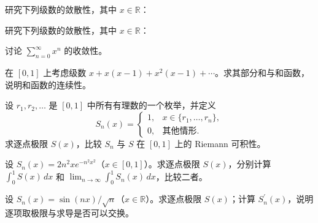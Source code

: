 \noindent\begin{minipage}{\textwidth}
研究下列级数的敛散性，其中 $x\in\mathbb R$：
\end{minipage}\par\vfill
\newpage
\noindent\begin{minipage}{\textwidth}
研究下列级数的敛散性，其中 $x\in\mathbb R$：
\end{minipage}\par\vfill
\noindent\begin{minipage}{\textwidth}
讨论 $\displaystyle\sum_{n=0}^{\infty}x^n$ 的收敛性。
\end{minipage}\par\vfill
\noindent\begin{minipage}{\textwidth}
在 $[0,1]$ 上考虑级数 $x+x(x-1)+x^2(x-1)+\cdots$。求其部分和与和函数，说明和函数的连续性。
\end{minipage}\par\vfill
\noindent\begin{minipage}{\textwidth}
设 $r_1,r_2,\ldots$ 是 $[0,1]$ 中所有有理数的一个枚举，并定义\[S_n(x)=\begin{cases}1,&x\in\{r_1,\ldots,r_n\},\\0,&\text{其他情形}.\end{cases}\]求逐点极限 $S(x)$，比较 $S_n$ 与 $S$ 在 $[0,1]$ 上的 Riemann 可积性。
\end{minipage}\par\vfill
\newpage
\noindent\begin{minipage}{\textwidth}
设 $S_n(x)=2n^2xe^{-n^2x^2}$（$x\in[0,1]$）。求逐点极限 $S(x)$，分别计算 $\int_0^1 S(x)\,dx$ 和 $\lim_{n\to\infty}\int_0^1 S_n(x)\,dx$，比较二者。
\end{minipage}\par\vfill
\noindent\begin{minipage}{\textwidth}
设 $S_n(x)=\sin(nx)/\sqrt n$（$x\in\mathbb R$）。求逐点极限 $S(x)$；计算 $S_n^{\prime}(x)$，说明逐项取极限与求导是否可以交换。
\end{minipage}\par\vfill
